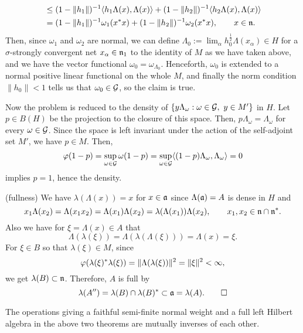 \documentclass{../../../small}
\begin{document}
\begin{pf}
\begin{align*}
&\le(1-\|h_1\|)^{-1}\langle h_1\Lambda(x),\Lambda(x)\rangle+(1-\|h_2\|)^{-1}\langle h_2\Lambda(x),\Lambda(x)\rangle\\
&=(1-\|h_1\|)^{-1}\omega_1(x^*x)+(1-\|h_2\|)^{-1}\omega_2(x^*x),\qquad x\in\mathfrak{n}.
\end{align*}
Then, since $\omega_1$ and $\omega_2$ are normal, we can define $\Lambda_0:=\lim_\alpha h_0^{\frac12}\Lambda(x_\alpha)\in H$ for a $\sigma$-strongly convergent net $x_\alpha\in\mathfrak{n}_1$ to the identity of $M$ as we have taken above, and we have the vector functional $\omega_0=\omega_{\Lambda_0}$.
Henceforth, $\omega_0$ is extended to a normal positive linear functional on the whole $M$, and finally the norm condition $\|h_0\|<1$ tells us that $\omega_0\in\mathcal{G}$, so the claim is true.

Now the problem is reduced to the density of $\{y\Lambda_{\omega}:\omega\in\mathcal{G},\ y\in M'\}$ in $H$.
Let $p\in B(H)$ be the projection to the closure of this space.
Then, $p\Lambda_\omega=\Lambda_\omega$ for every $\omega\in\mathcal{G}$.
Since the space is left invariant under the action of the self-adjoint set $M'$, we have $p\in M$.
Then,
\[\varphi(1-p)=\sup_{\omega\in\mathcal{G}}\omega(1-p)=\sup_{\omega\in\mathcal{G}}\langle(1-p)\Lambda_\omega,\Lambda_\omega\rangle=0\]
implies $p=1$, hence the density.

(fullness)
We have $\lambda(\Lambda(x))=x$ for $x\in\mathfrak{a}$ since $\Lambda(\mathfrak{a})=A$ is dense in $H$ and
\[x_1\Lambda(x_2)=\Lambda(x_1x_2)=\Lambda(x_1)\Lambda(x_2)=\lambda(\Lambda(x_1))\Lambda(x_2),\qquad x_1,x_2\in\mathfrak{n}\cap\mathfrak{n}^*.\]
Also we have for $\xi=\Lambda(x)\in A$ that
\[\Lambda(\lambda(\xi))=\Lambda(\lambda(\Lambda(\xi)))=\Lambda(x)=\xi.\]
For $\xi\in B$ so that $\lambda(\xi)\in M$, since
\[\varphi(\lambda(\xi)^*\lambda(\xi))=\|\Lambda(\lambda(\xi))\|^2=\|\xi\|^2<\infty,\]
we get $\lambda(B)\subset\mathfrak{n}$.
Therefore, $A$ is full by
\[\lambda(A'')=\lambda(B)\cap\lambda(B)^*\subset\mathfrak{a}=\lambda(A).\qedhere\]
\end{pf}

\begin{cor}
The operations giving a faithful semi-finite normal weight and a full left Hilbert algebra in the above two theorems are mutually inverses of each other.
\end{cor}
\end{document}
